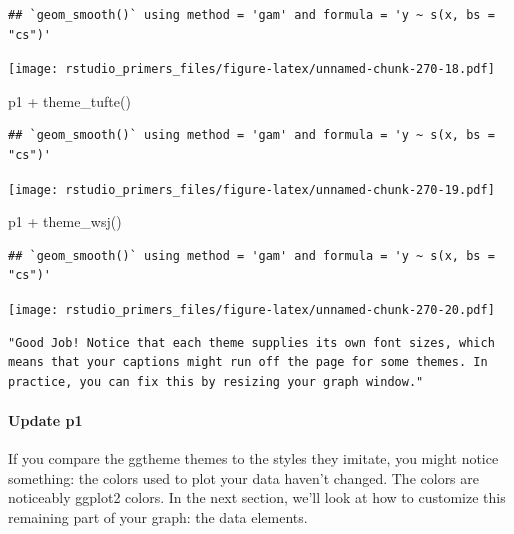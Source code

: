 \documentclass[
]{article}
\newenvironment{Shaded}{\begin{snugshade}}{\end{snugshade}}
\newcommand{\FunctionTok}[1]{\textcolor[rgb]{0.00,0.00,0.00}{#1}}
\newcommand{\NormalTok}[1]{#1}
\newcommand{\SpecialCharTok}[1]{\textcolor[rgb]{0.00,0.00,0.00}{#1}}
\begin{document}
\begin{verbatim}
## `geom_smooth()` using method = 'gam' and formula = 'y ~ s(x, bs = "cs")'
\end{verbatim}

\texttt{[image: rstudio\_primers\_files/figure-latex/unnamed-chunk-270-18.pdf]}

\begin{Shaded}
\begin{Highlighting}[]
\NormalTok{p1 }\SpecialCharTok{+} \FunctionTok{theme\_tufte}\NormalTok{()}
\end{Highlighting}
\end{Shaded}

\begin{verbatim}
## `geom_smooth()` using method = 'gam' and formula = 'y ~ s(x, bs = "cs")'
\end{verbatim}

\texttt{[image: rstudio\_primers\_files/figure-latex/unnamed-chunk-270-19.pdf]}

\begin{Shaded}
\begin{Highlighting}[]
\NormalTok{p1 }\SpecialCharTok{+} \FunctionTok{theme\_wsj}\NormalTok{()}
\end{Highlighting}
\end{Shaded}

\begin{verbatim}
## `geom_smooth()` using method = 'gam' and formula = 'y ~ s(x, bs = "cs")'
\end{verbatim}

\texttt{[image: rstudio\_primers\_files/figure-latex/unnamed-chunk-270-20.pdf]}

\begin{verbatim}
"Good Job! Notice that each theme supplies its own font sizes, which means that your captions might run off the page for some themes. In practice, you can fix this by resizing your graph window."
\end{verbatim}

\hypertarget{update-p1}{%
\paragraph{Update p1}\label{update-p1}}

If you compare the ggtheme themes to the styles they imitate, you might
notice something: the colors used to plot your data haven't changed. The
colors are noticeably ggplot2 colors. In the next section, we'll look at
how to customize this remaining part of your graph: the data elements.
\end{document}
